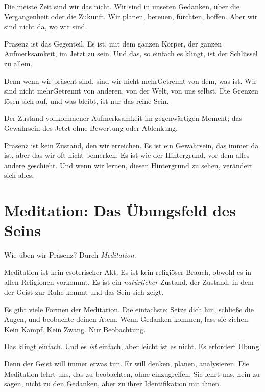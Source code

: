 Die meiste Zeit sind wir das nicht. Wir sind in unseren Gedanken, über die Vergangenheit oder die Zukunft. Wir planen, bereuen, fürchten, hoffen. Aber wir sind nicht da, wo wir sind.

Präsenz ist das Gegenteil. Es ist, mit dem ganzen Körper, der ganzen Aufmerksamkeit, im Jetzt zu sein. Und das, so einfach es klingt, ist der Schlüssel zu allem.

Denn wenn wir präsent sind, sind wir nicht mehrGetrennt von dem, was ist. Wir sind nicht mehrGetrennt von anderen, von der Welt, von uns selbst. Die Grenzen lösen sich auf, und was bleibt, ist nur das reine Sein.

\begin{defi}[Präsenz]
	Der Zustand vollkommener Aufmerksamkeit im gegenwärtigen Moment; das Gewahrsein des Jetzt ohne Bewertung oder Ablenkung.
\end{defi}

Präsenz ist kein Zustand, den wir \glqq erreichen\grqq{}. Es ist ein Gewahrsein, das immer da ist, aber das wir oft nicht bemerken. Es ist wie der Hintergrund, vor dem alles andere geschieht. Und wenn wir lernen, diesen Hintergrund zu sehen, verändert sich alles.

\section{Meditation: Das Übungsfeld des Seins}

Wie üben wir Präsenz? Durch \emph{Meditation}.

Meditation ist kein esoterischer Akt. Es ist kein religiöser Brauch, obwohl es in allen Religionen vorkommt. Es ist ein \emph{natürlicher} Zustand, der Zustand, in dem der Geist zur Ruhe kommt und das Sein sich zeigt.

Es gibt viele Formen der Meditation. Die einfachste: Setze dich hin, schließe die Augen, und beobachte deinen Atem. Wenn Gedanken kommen, lass sie ziehen. Kein Kampf. Kein Zwang. Nur Beobachtung.

Das klingt einfach. Und es \emph{ist} einfach, aber leicht ist es nicht. Es erfordert Übung.

Denn der Geist will immer etwas tun. Er will denken, planen, analysieren. Die Meditation lehrt uns, das zu beobachten, ohne einzugreifen. Sie lehrt uns, \glqq nein\grqq{} zu sagen, nicht zu den Gedanken, aber zu ihrer Identifikation mit ihnen.

